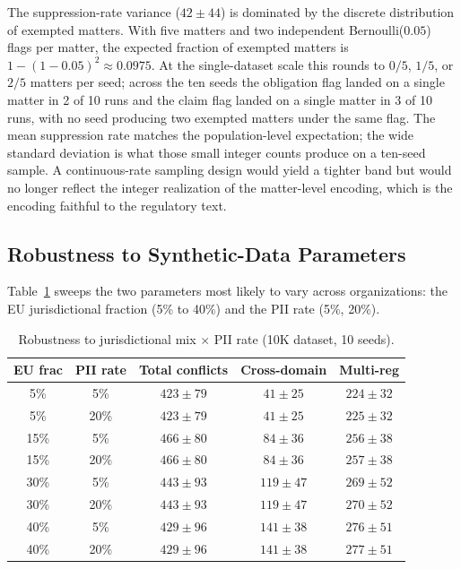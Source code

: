 \documentclass{ieeeaccess}
\begin{document}
The suppression-rate variance ($42 \pm 44$) is dominated by the discrete distribution of exempted matters. With five matters and two independent Bernoulli($0.05$) flags per matter, the expected fraction of exempted matters is $1{-}(1{-}0.05)^2 \approx 0.0975$. At the single-dataset scale this rounds to $0/5$, $1/5$, or $2/5$ matters per seed; across the ten seeds the obligation flag landed on a single matter in 2 of 10 runs and the claim flag landed on a single matter in 3 of 10 runs, with no seed producing two exempted matters under the same flag. The mean suppression rate matches the population-level expectation; the wide standard deviation is what those small integer counts produce on a ten-seed sample. A continuous-rate sampling design would yield a tighter band but would no longer reflect the integer realization of the matter-level encoding, which is the encoding faithful to the regulatory text.

\subsection{Robustness to Synthetic-Data Parameters}
\label{sec:robustness}

Table~\ref{tab:robustness} sweeps the two parameters most likely to vary across organizations: the EU jurisdictional fraction (5\% to 40\%) and the PII rate (5\%, 20\%).

\begin{table}[t]
\centering
\caption{Robustness to jurisdictional mix $\times$ PII rate (10K dataset, 10 seeds).}
\label{tab:robustness}
\begin{tabular}{ccccc}
\hline\hline
EU frac & PII rate & Total conflicts & Cross-domain & Multi-reg \\
\hline
5\%  & 5\%  & $423 \pm 79$ & $41 \pm 25$  & $224 \pm 32$ \\
5\%  & 20\% & $423 \pm 79$ & $41 \pm 25$  & $225 \pm 32$ \\
15\% & 5\%  & $466 \pm 80$ & $84 \pm 36$  & $256 \pm 38$ \\
15\% & 20\% & $466 \pm 80$ & $84 \pm 36$  & $257 \pm 38$ \\
30\% & 5\%  & $443 \pm 93$ & $119 \pm 47$ & $269 \pm 52$ \\
30\% & 20\% & $443 \pm 93$ & $119 \pm 47$ & $270 \pm 52$ \\
40\% & 5\%  & $429 \pm 96$ & $141 \pm 38$ & $276 \pm 51$ \\
40\% & 20\% & $429 \pm 96$ & $141 \pm 38$ & $277 \pm 51$ \\
\hline\hline
\end{tabular}
\end{table}
\end{document}
